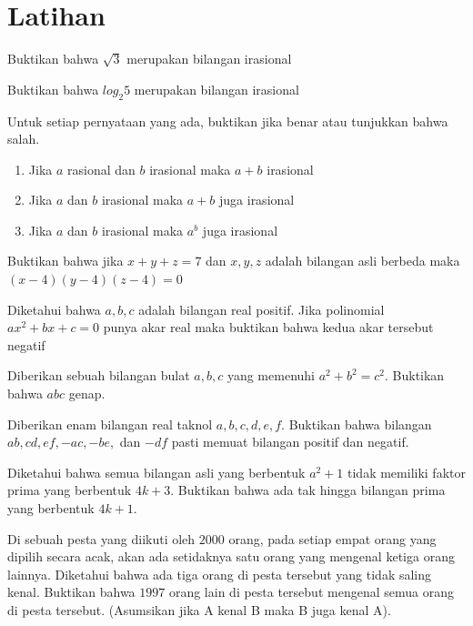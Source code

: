 \documentclass[11pt]{scrartcl}
\begin{document}
\section{Latihan}
\begin{problem}
    Buktikan bahwa $\sqrt{3}$ merupakan bilangan irasional
\end{problem}
\begin{problem}
    Buktikan bahwa $log_2{5}$ merupakan bilangan irasional
\end{problem}
\begin{problem}
    Untuk setiap pernyataan yang ada, buktikan jika benar atau tunjukkan bahwa salah.
    \begin{enumerate}
        \item Jika $a$ rasional dan $b$ irasional maka $a + b$ irasional
        \item Jika $a$ dan $b$ irasional maka $a + b$ juga irasional
        \item Jika $a$ dan $b$ irasional maka $a^b$ juga irasional
    \end{enumerate}
\end{problem}
\begin{problem}
    Buktikan bahwa jika $x + y + z = 7$ dan $x, y, z$ adalah bilangan asli berbeda maka $(x - 4)(y - 4)(z - 4) = 0$
\end{problem}
\begin{problem}
    Diketahui bahwa $a, b, c$ adalah bilangan real positif. Jika polinomial $ax^2 + bx + c = 0$ punya akar real maka buktikan bahwa kedua akar tersebut negatif 
\end{problem}
\begin{problem}
    Diberikan sebuah bilangan bulat $a, b, c$ yang memenuhi $a^2 + b^2 = c^2$. Buktikan bahwa $abc$ genap.
\end{problem}
\begin{problem}
    Diberikan enam bilangan real taknol $a, b, c, d, e, f$. Buktikan bahwa bilangan $ab, cd, ef, -ac, -be,$ dan $-df$ pasti memuat bilangan positif dan negatif.
\end{problem}
\begin{problem}
    Diketahui bahwa semua bilangan asli yang berbentuk $a^2 + 1$ tidak memiliki faktor prima yang berbentuk $4k + 3$. Buktikan bahwa ada tak hingga bilangan prima yang berbentuk $4k + 1$.
\end{problem}
\begin{problem}
    Di sebuah pesta yang diikuti oleh $2000$ orang, pada setiap empat orang yang dipilih secara acak, akan ada setidaknya satu orang yang mengenal ketiga orang lainnya. Diketahui bahwa ada tiga orang di pesta tersebut yang tidak saling kenal. Buktikan bahwa $1997$ orang lain di pesta tersebut mengenal semua orang di pesta tersebut. (Asumsikan jika A kenal B maka B juga kenal A). 
\end{problem}
\end{document}
